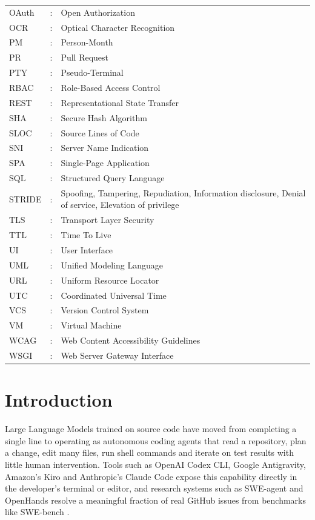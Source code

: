 \documentclass[12pt,a4paper,oneside]{report}
\begin{document}
\begin{longtable}{@{}p{1.1in}@{}p{0.25in}@{}p{4.9in}@{}}
OAuth &: & Open Authorization \\[2pt]
OCR &: & Optical Character Recognition \\[2pt]
PM &: & Person-Month \\[2pt]
PR &: & Pull Request \\[2pt]
PTY &: & Pseudo-Terminal \\[2pt]
RBAC &: & Role-Based Access Control \\[2pt]
REST &: & Representational State Transfer \\[2pt]
SHA &: & Secure Hash Algorithm \\[2pt]
SLOC &: & Source Lines of Code \\[2pt]
SNI &: & Server Name Indication \\[2pt]
SPA &: & Single-Page Application \\[2pt]
SQL &: & Structured Query Language \\[2pt]
STRIDE &: & Spoofing, Tampering, Repudiation, Information disclosure, Denial of service, Elevation of privilege \\[2pt]
TLS &: & Transport Layer Security \\[2pt]
TTL &: & Time To Live \\[2pt]
UI &: & User Interface \\[2pt]
UML &: & Unified Modeling Language \\[2pt]
URL &: & Uniform Resource Locator \\[2pt]
UTC &: & Coordinated Universal Time \\[2pt]
VCS &: & Version Control System \\[2pt]
VM &: & Virtual Machine \\[2pt]
WCAG &: & Web Content Accessibility Guidelines \\[2pt]
WSGI &: & Web Server Gateway Interface \\[2pt]
\end{longtable}

\clearpage
{}
\setcounter{page}{1}

\chapter{Introduction}\label{introduction}

Large Language Models trained on source code have moved from completing a single line to operating as autonomous coding agents that read a repository, plan a change, edit many files, run shell commands and iterate on test results with little human intervention. Tools such as OpenAI Codex CLI, Google Antigravity, Amazon's Kiro and Anthropic's Claude Code expose this capability directly in the developer's terminal or editor, and research systems such as SWE-agent \cite{ref3} and OpenHands \cite{ref4} resolve a meaningful fraction of real GitHub issues from benchmarks like SWE-bench \cite{ref2}.
\end{document}
